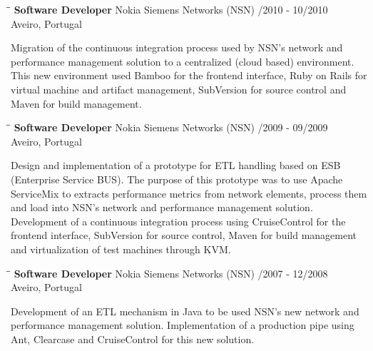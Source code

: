 \documentclass{res}
\begin{document}
\begin{resume}
\begin{tabbing}
\hspace{2.3in}\= \hspace{2.6in}\= \kill %
{\bf Software Developer} \>Nokia Siemens Networks (NSN)    
/2010 - 10/2010\\ \>Aveiro, Portugal
\end{tabbing}\vspace{-20pt}      %
Migration of the continuous integration process used by NSN's network and performance management solution to a centralized (cloud based) environment.
This new environment used Bamboo for the frontend interface, Ruby on Rails for virtual machine and artifact management, SubVersion for source control and Maven for build management.

\begin{tabbing}
\hspace{2.3in}\= \hspace{2.6in}\= \kill %
{\bf Software Developer} \>Nokia Siemens Networks (NSN)    
/2009 - 09/2009\\ \>Aveiro, Portugal
\end{tabbing}\vspace{-20pt}      %
Design and implementation of a prototype for ETL handling based on ESB (Enterprise Service BUS).
The purpose of this prototype was to use Apache ServiceMix to extracts performance metrics from network elements, process them and load into NSN's network and performance management solution.
Development of a continuous integration process using CruiseControl for the frontend interface, SubVersion for source control, Maven for build management and virtualization of test machines through KVM.

\begin{tabbing}
\hspace{2.3in}\= \hspace{2.6in}\= \kill %
{\bf Software Developer} \>Nokia Siemens Networks (NSN)    
/2007 - 12/2008\\ \>Aveiro, Portugal
\end{tabbing}\vspace{-20pt}      %
Development of an ETL mechanism in Java to be used NSN's new network and performance management solution.
Implementation of a production pipe using Ant, Clearcase and CruiseControl for this new solution.


\end{resume}
\end{document}

